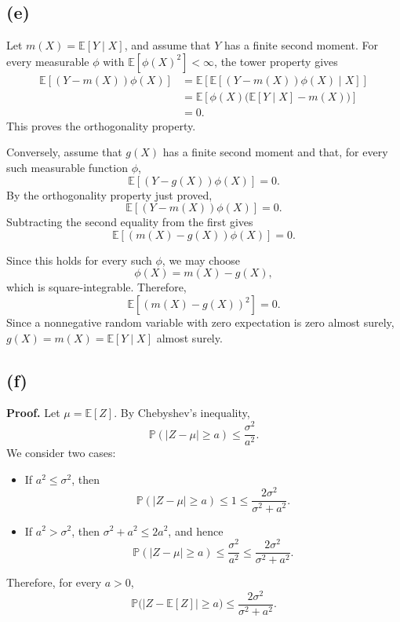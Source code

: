 \documentclass[11pt,a4paper]{article}
\begin{document}
\subsection*{(e)}
Let \(m(X)=\mathbb{E}[Y\mid X]\), and assume that \(Y\) has a finite
second moment. For every measurable \(\phi\) with
\(\mathbb{E}[\phi(X)^2]<\infty\), the tower property gives
\[
\begin{aligned}
\mathbb{E}[(Y-m(X))\phi(X)]
&=\mathbb{E}\!\left[
  \mathbb{E}[(Y-m(X))\phi(X)\mid X]\right]\\
&=\mathbb{E}\!\left[
  \phi(X)\bigl(\mathbb{E}[Y\mid X]-m(X)\bigr)\right]\\
&=0.
\end{aligned}
\]
This proves the orthogonality property.

Conversely, assume that \(g(X)\) has a finite second moment and that,
for every such measurable function \(\phi\),
\[
\mathbb{E}[(Y-g(X))\phi(X)]=0.
\]
By the orthogonality property just proved,
\[
\mathbb{E}[(Y-m(X))\phi(X)]=0.
\]
Subtracting the second equality from the first gives
\[
\mathbb{E}[(m(X)-g(X))\phi(X)]=0.
\]

Since this holds for every such \(\phi\), we may choose
\[
\phi(X)=m(X)-g(X),
\]
which is square-integrable. Therefore,
\[
\mathbb{E}[(m(X)-g(X))^2]=0.
\]
Since a nonnegative random variable with zero expectation is zero almost surely,
\(g(X)=m(X)=\mathbb{E}[Y\mid X]\) almost surely.

\subsection*{(f)}
\textbf{Proof.}
Let \(\mu=\mathbb{E}[Z]\). By Chebyshev's inequality,
\[
\mathbb{P}(|Z-\mu|\ge a)\le \frac{\sigma^2}{a^2}.
\]
We consider two cases:

\begin{itemize}
    \item If \(a^2\le \sigma^2\), then
    \[
    \mathbb{P}(|Z-\mu|\ge a)
    \le 1
    \le \frac{2\sigma^2}{\sigma^2+a^2}.
    \]

    \item If \(a^2>\sigma^2\), then \(\sigma^2+a^2\le 2a^2\), and hence
    \[
    \mathbb{P}(|Z-\mu|\ge a)
    \le \frac{\sigma^2}{a^2}
    \le \frac{2\sigma^2}{\sigma^2+a^2}.
    \]
\end{itemize}

Therefore, for every \(a>0\),
\[
\mathbb{P}\bigl(|Z-\mathbb{E}[Z]|\ge a\bigr)
\le \frac{2\sigma^2}{\sigma^2+a^2}.
\]
\end{document}
